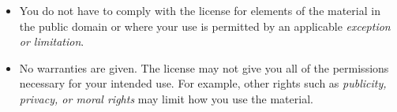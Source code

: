 \begin{itemize}
    \item You do not have to comply with the license for elements of the
    material in the public domain or where your use is permitted by an 
    applicable \emph{exception or limitation}.

    \item No warranties are given. The license may not give you all of the 
    permissions necessary for your intended use. For example, other rights such
    as \emph{publicity, privacy, or moral rights} may limit how you use the
    material.
\end{itemize}

